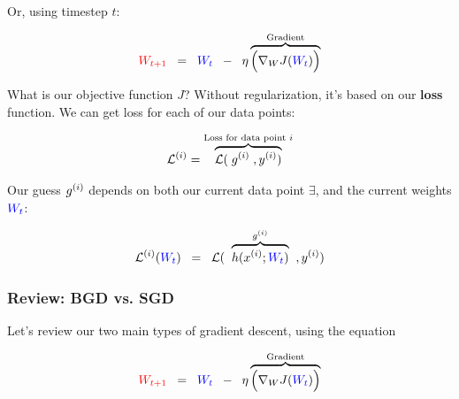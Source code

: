             Or, using timestep $t$:
            
            \begin{equation}
                \textcolor{red}{ W_{t+1} } 
                \;\;=\;\;
                \textcolor{blue}{ W_t }
                \;\;-\;\;
                \eta
                \overbrace{
                    \Big(
                        \nabla_W J ( \textcolor{blue}{ W_t } )
                    \Big)
                }^{\text{Gradient}}
            \end{equation}
            
            What is our objective function $J$? Without regularization, it's based on our \textbf{loss} function. We can get loss for each of our data points:
            
            \begin{equation}
                \mathcal{L}^{(i)}
                =
                \overbrace{
                    \mathcal{L}(
                    \; g^{(i)} \;
                    ,y^{(i)}
                    )
                }^{\text{Loss for data point $i$}}
            \end{equation}
            
            Our guess $g^{(i)}$ depends on both our current data point $\exi$, and the current weights $\textcolor{blue}{ W_t }$:
            
            \begin{equation}
                \mathcal{L}^{(i)}(\textcolor{blue}{ W_t })
                \;\;=\;\;
                \mathcal{L}(
                \;\;
                \overbrace{
                     h(x^{(i)};\textcolor{blue}{ W_t }) 
                }^{g^{(i)}}
                \;\;
                ,y^{(i)}
                )
            \end{equation}
    
        \subsecdiv
    
        \subsubsection{Review: BGD vs. SGD}
        
            Let's review our two main types of gradient descent, using the equation
            
            \begin{equation}
                \textcolor{red}{ W_{t+1} } 
                \;\;=\;\;
                \textcolor{blue}{ W_t }
                \;\;-\;\;
                \eta
                \overbrace{
                    \Big(
                        \nabla_W J ( \textcolor{blue}{ W_t } )
                    \Big)
                }^{\text{Gradient}}
            \end{equation}
            
